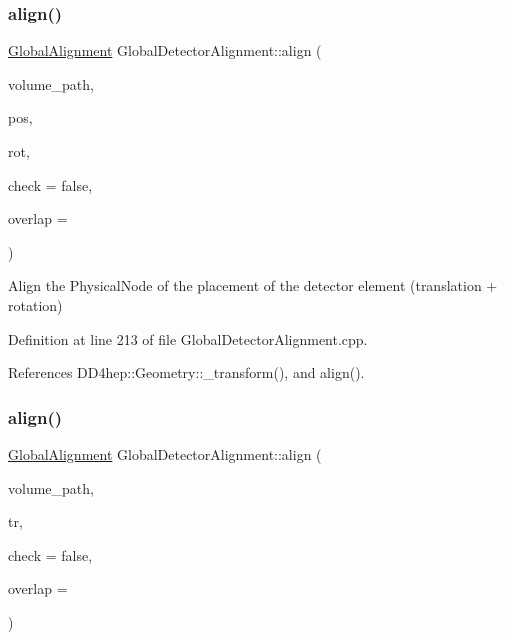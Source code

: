 \subsubsection{\texorpdfstring{align()}{align()}\hspace{0.1cm}{\footnotesize\ttfamily [8/10]}}
{\footnotesize\ttfamily \hyperlink{class_d_d4hep_1_1_alignments_1_1_global_alignment}{Global\+Alignment} Global\+Detector\+Alignment\+::align (\begin{DoxyParamCaption}\item[{const std\+::string \&}]{volume\+\_\+path,  }\item[{const Position \&}]{pos,  }\item[{const Rotation\+Z\+YX \&}]{rot,  }\item[{bool}]{check = {\ttfamily false},  }\item[{double}]{overlap = {} }\end{DoxyParamCaption})}



Align the Physical\+Node of the placement of the detector element (translation + rotation) 



Definition at line 213 of file Global\+Detector\+Alignment.\+cpp.



References D\+D4hep\+::\+Geometry\+::\+\_\+transform(), and align().

\hypertarget{class_d_d4hep_1_1_alignments_1_1_global_detector_alignment_ad269df33b11aa03911a8dd72512eba7b}{}\label{class_d_d4hep_1_1_alignments_1_1_global_detector_alignment_ad269df33b11aa03911a8dd72512eba7b} 
\subsubsection{\texorpdfstring{align()}{align()}\hspace{0.1cm}{\footnotesize\ttfamily [9/10]}}
{\footnotesize\ttfamily \hyperlink{class_d_d4hep_1_1_alignments_1_1_global_alignment}{Global\+Alignment} Global\+Detector\+Alignment\+::align (\begin{DoxyParamCaption}\item[{const std\+::string \&}]{volume\+\_\+path,  }\item[{const Transform3D \&}]{tr,  }\item[{bool}]{check = {\ttfamily false},  }\item[{double}]{overlap = {} }\end{DoxyParamCaption})}



